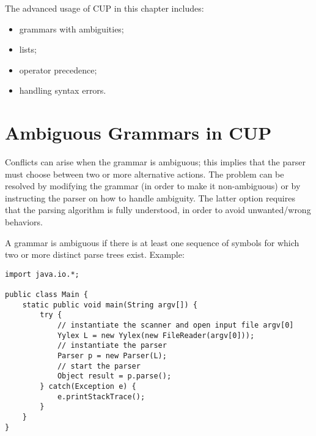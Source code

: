 The advanced usage of CUP in this chapter includes:
\begin{itemize}
    \item
    grammars with ambiguities;
    \item
    lists;
    \item
    operator precedence;
    \item
    handling syntax errors.
\end{itemize}

\section{Ambiguous Grammars in CUP}
Conflicts can arise when the grammar is ambiguous; this implies that the parser must choose between two or more alternative actions.
The problem can be resolved by modifying the grammar (in order to make it non-ambiguous) or by instructing the parser on how to handle ambiguity.
The latter option requires that the parsing algorithm is fully understood, in order to avoid unwanted/wrong behaviors.

A grammar is ambiguous if there is at least one sequence of symbols for which two or more distinct parse trees exist.
Example:
\begin{lstlisting}
import java.io.*;

public class Main {
    static public void main(String argv[]) {
        try {
            // instantiate the scanner and open input file argv[0]
            Yylex L = new Yylex(new FileReader(argv[0]));
            // instantiate the parser
            Parser p = new Parser(L);
            // start the parser
            Object result = p.parse();
        } catch(Exception e) {
            e.printStackTrace();
        }
    }
}
\end{lstlisting}